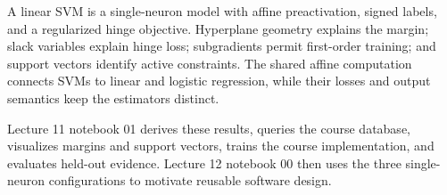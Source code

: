 \begin{chapterreview}
A linear SVM is a single-neuron model with affine preactivation, signed labels,
and a regularized hinge objective. Hyperplane geometry explains the margin;
slack variables explain hinge loss; subgradients permit first-order training;
and support vectors identify active constraints. The shared affine computation
connects SVMs to linear and logistic regression, while their losses and output
semantics keep the estimators distinct.
\end{chapterreview}

\begin{notebooklink}
Lecture 11 notebook 01 derives these results, queries the course database,
visualizes margins and support vectors, trains the course implementation, and
evaluates held-out evidence. Lecture 12 notebook 00 then uses the three
single-neuron configurations to motivate reusable software design.
\end{notebooklink}
